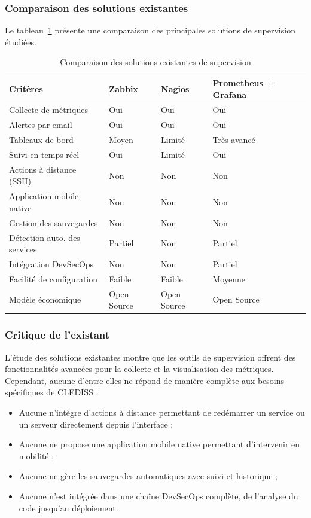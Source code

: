 \subsubsection*{Comparaison des solutions existantes}
Le tableau~\ref{tab:comparaison-existant} présente une comparaison des principales
solutions de supervision étudiées.

\begin{table}[H]
\centering
\renewcommand{\arraystretch}{1.5}
\begin{tabular}{|p{4.8cm}|p{2.6cm}|p{2.6cm}|p{3.2cm}|}
\hline
\textbf{Critères} & \textbf{Zabbix} & \textbf{Nagios} & \textbf{Prometheus + Grafana} \\
\hline
Collecte de métriques & Oui & Oui & Oui \\
\hline
Alertes par email & Oui & Oui & Oui \\
\hline
Tableaux de bord & Moyen & Limité & Très avancé \\
\hline
Suivi en temps réel & Oui & Limité & Oui \\
\hline
Actions à distance (SSH) & Non & Non & Non \\
\hline
Application mobile native & Non & Non & Non \\
\hline
Gestion des sauvegardes & Non & Non & Non \\
\hline
Détection auto. des services & Partiel & Non & Partiel \\
\hline
Intégration DevSecOps & Non & Non & Partiel \\
\hline
Facilité de configuration & Faible & Faible & Moyenne \\
\hline
Modèle économique & Open Source & Open Source & Open Source \\
\hline
\end{tabular}
\caption{Comparaison des solutions existantes de supervision}
\label{tab:comparaison-existant}
\end{table}

\subsubsection*{Critique de l'existant}
L'étude des solutions existantes montre que les outils de supervision offrent des
fonctionnalités avancées pour la collecte et la visualisation des métriques. Cependant,
aucune d'entre elles ne répond de manière complète aux besoins spécifiques de CLEDISS :

\begin{itemize}[label=]
\item Aucune n'intègre d'actions à distance permettant de redémarrer un service ou un
      serveur directement depuis l'interface ;
\item Aucune ne propose une application mobile native permettant d'intervenir en
      mobilité ;
\item Aucune ne gère les sauvegardes automatiques avec suivi et historique ;
\item Aucune n'est intégrée dans une chaîne DevSecOps complète, de l'analyse du code
      jusqu'au déploiement.
\end{itemize}

